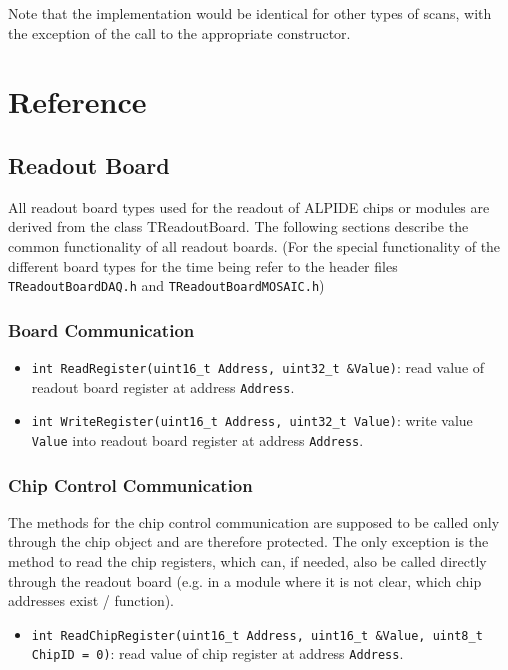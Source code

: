 \documentclass{article}
\begin{document}
Note that the implementation would be identical for other types of scans, with the exception of the call to the appropriate constructor. 

\clearpage
\section {Reference}

\subsection{Readout Board}

All readout board types used for the readout of ALPIDE chips or modules are
derived from the class TReadoutBoard. The following sections describe
the common functionality of all readout boards. (For the special
functionality of the different board types for the time being refer to
the header files \texttt{TReadoutBoardDAQ.h} and \texttt{TReadoutBoardMOSAIC.h})


\subsubsection{Board Communication}

\begin{itemize}
\item \texttt{int ReadRegister(uint16\_t Address, uint32\_t \&Value)}:
  \newline read value of readout board register at address \texttt{Address}.
\item \texttt{int WriteRegister(uint16\_t Address, uint32\_t Value)}:
  \newline write value \texttt{Value} into readout board register at address
\texttt{Address}.
\end{itemize}



\subsubsection{Chip Control Communication}

The methods for the chip control communication are supposed to be
called only through the chip object and are therefore protected. The
only exception is the method to read the chip registers, which can, if
needed, also be called directly through the readout board (e.g. in a
module where it is not clear, which chip addresses exist / function). 

\begin{itemize}
\item \texttt{int ReadChipRegister(uint16\_t Address, uint16\_t \&Value, uint8\_t ChipID = 0)}: \newline read value of chip register at address \texttt{Address}.
\end{itemize}
\end{document}
